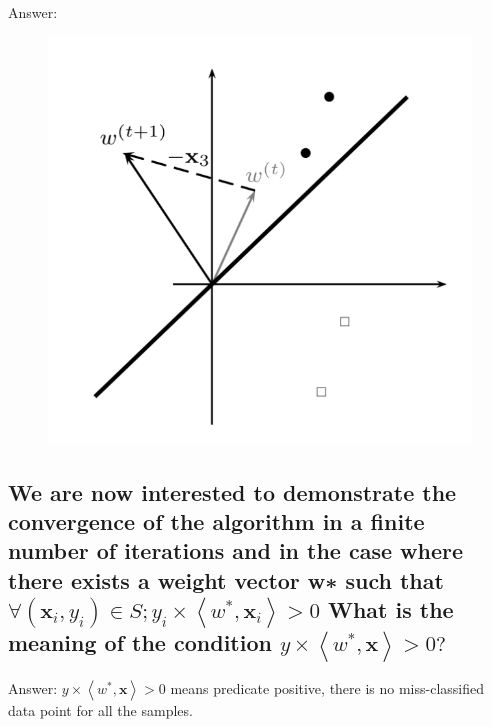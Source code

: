 \documentclass{article}
\begin{document}
Answer:
\newline 
\begin{figure}[h!]
    \centering
    \includegraphics[scale=0.5]{figure-2-d.png}
    \caption{}
    \label{}
\end{figure}
\subsection{\textbf{We are now interested to demonstrate the convergence of the algorithm in a finite number of iterations and in the case where there exists a weight vector w∗ such that $\forall\left(\mathbf{x}_{i}, y_{i}\right) \in S ; y_{i} \times\left\langle w^{*}, \mathbf{x}_{i}\right\rangle>0$ What is the meaning of the condition $y \times\left\langle w^{*}, \mathbf{x}\right\rangle>0 ?$}}

Answer:
\newline 
$y \times\left\langle w^{*}, \mathbf{x}\right\rangle>0 $ means predicate positive, there is no miss-classified data point for all the samples.
\newline



\end{document}
